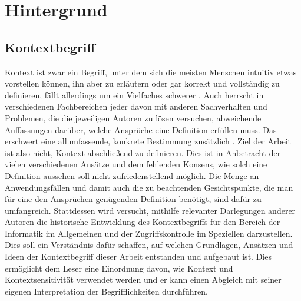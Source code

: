 \chapter{Hintergrund}%
\label{cha:background}


\section{Kontextbegriff}
Kontext ist zwar ein Begriff, unter dem sich die meisten Menschen intuitiv etwas vorstellen können, ihn aber zu erläutern oder gar korrekt und vollständig zu definieren, fällt allerdings um ein Vielfaches schwerer \cite{dey_understanding_2001}. Auch herrscht in verschiedenen Fachbereichen jeder davon mit anderen Sachverhalten und Problemen, die die jeweiligen Autoren zu lösen versuchen, abweichende Auffassungen darüber, welche Ansprüche eine Definition erfüllen muss. Das erschwert eine allumfassende, konkrete Bestimmung zusätzlich \cite{hutchison_understanding_2005}. Ziel der Arbeit ist also nicht, Kontext abschließend zu definieren. Dies ist in Anbetracht der vielen verschiedenen Ansätze und dem fehlenden Konsens, wie solch eine Definition aussehen soll \cite{alegre_engineering_2016, wei_liu_survey_2011} nicht zufriedenstellend möglich. Die Menge an Anwendungsfällen und damit auch die zu beachtenden Gesichtspunkte, die man für eine den Ansprüchen genügenden Definition benötigt, sind dafür zu umfangreich. Stattdessen wird versucht, mithilfe relevanter Darlegungen anderer Autoren die historische Entwicklung des Kontextbegriffs für den Bereich der Informatik im Allgemeinen und der Zugriffskontrolle im Speziellen darzustellen. Dies soll ein Verständnis dafür schaffen, auf welchen Grundlagen, Ansätzen und Ideen der Kontextbegriff dieser Arbeit entstanden und aufgebaut ist. Dies ermöglicht dem Leser eine Einordnung davon, wie Kontext und Kontextsensitivität verwendet werden und er kann einen Abgleich mit seiner eigenen Interpretation der Begrifflichkeiten durchführen.
